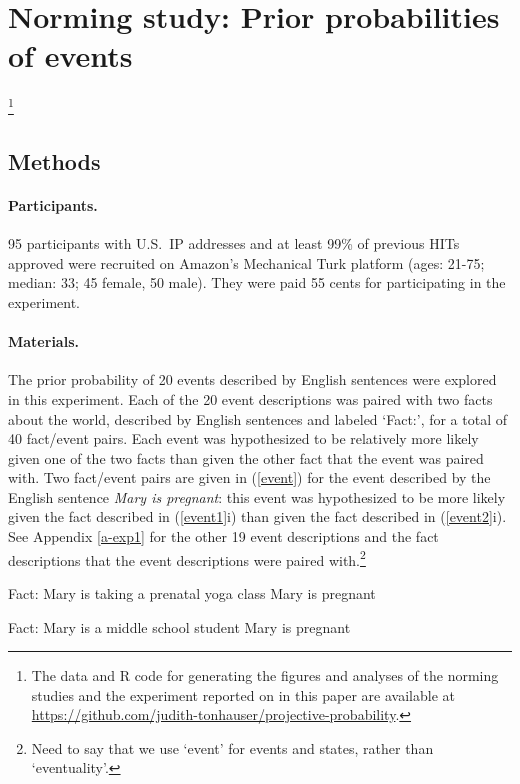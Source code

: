 \documentclass[11pt,fleqn]{article}
\newcommand{\6}{\mbox{$[\hspace*{-.6mm}[$}}
\newcommand{\9}{\mbox{$]\hspace*{-.6mm}]$}}
\begin{document}
\section{Norming study: Prior probabilities of events}\label{s-norming}

\footnote{\label{f-github}The
data and R code for generating the figures and analyses
of the norming studies and the experiment reported on in this paper are available at \url{https://github.com/judith-tonhauser/projective-probability}.}

\subsection{Methods}\label{s-methods-1}

\paragraph{Participants.} 95 participants with U.S.\ IP addresses and at least 99\% of previous HITs approved were recruited on Amazon's Mechanical Turk platform (ages: 21-75; median: 33; 45 female, 50 male). They were paid 55 cents for participating in the experiment. 

\paragraph{Materials.} The prior probability of 20 events described by English sentences were explored in this experiment. Each of the 20 event descriptions was paired with two facts about the world, described by English sentences and labeled `Fact:', for a total of 40 fact/event pairs. Each event was hypothesized to be relatively more likely given one of the two facts than given the other fact that the event was paired with. Two fact/event pairs are given in (\ref{event}) for the event described by the English sentence {\em Mary is pregnant}: this event was hypothesized to be more likely given the fact described in (\ref{event1}i) than given the fact described in (\ref{event2}i). See Appendix \ref{a-exp1} for the other 19 event descriptions and the fact descriptions that the event descriptions were paired with.\footnote{Need to say that we use `event' for events and states, rather than `eventuality'.}

\begin{exe}
\ex\label{event}
\begin{xlist}
\ex\label{event1}
\begin{xlist}
\ex Fact: Mary is taking a prenatal yoga class
\ex Mary is pregnant
\end{xlist}
\ex\label{event2}
\begin{xlist}
\ex Fact: Mary is a middle school student
\ex Mary is pregnant
\end{xlist}
\end{xlist}
\end{exe}
\end{document}
